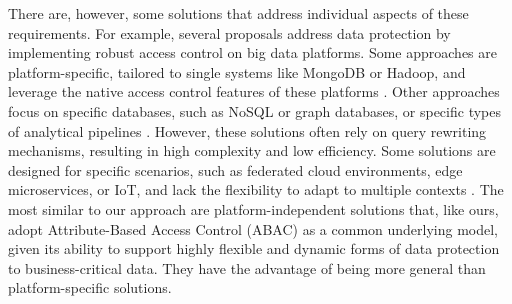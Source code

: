 There are, however, some solutions that address individual aspects of these requirements. For example, several proposals address data protection by implementing robust access control on big data platforms. Some approaches are platform-specific, tailored to single systems like MongoDB or Hadoop, and leverage the native access control features of these platforms \cite{rathore2017hadoop,anisetti2018privacy,FederationAC:Journ:2020,Sandhu:ABAC:2018,GuptaSandu:2017}. Other approaches focus on specific databases, such as NoSQL or graph databases, or specific types of analytical pipelines  \cite{AConGraphDB:2021, AConMongoDB:2022, ABACforHBase:2019}. However, these solutions often rely on query rewriting mechanisms, resulting in high complexity and low efficiency. Some solutions are designed for specific scenarios, such as federated cloud environments, edge microservices, or IoT, and lack the flexibility to adapt to multiple contexts \cite{MultipartyAC:2019, IoTSecurity}.
%
The most similar to our approach are platform-independent solutions that, like ours, adopt Attribute-Based Access Control (ABAC) \cite{XACML3.0} as a common underlying model, given its ability to support highly flexible and dynamic forms of data protection to business-critical data. They have the advantage of being more general than platform-specific solutions. 

